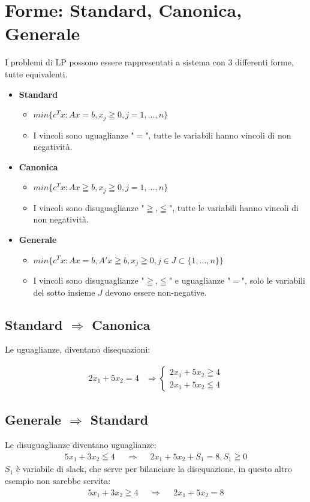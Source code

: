 \documentclass{article}
\begin{document}
\section{Forme: Standard, Canonica, Generale}
I problemi di LP possono essere rappresentati a sistema con 3 differenti forme, tutte equivalenti.\\
\begin{itemize}
\item \textbf{Standard}
\begin{itemize}
\item $min\{c^Tx:Ax=b,x_j \geqq 0, j=1,\dots,n \}$
\item I vincoli sono uguaglianze "$=$", tutte le variabili hanno vincoli di non negatività.
\end{itemize}

\item \textbf{Canonica}
\begin{itemize}
\item $min\{c^Tx:Ax \geqq b,x_j \geqq 0, j=1,\dots,n \}$
\item I vincoli sono disuguaglianze "$\geqq$,$\leqq$", tutte le variabili hanno vincoli di non negatività.
\end{itemize}

\item \textbf{Generale}
\begin{itemize}
\item $min\{c^Tx:Ax = b, A'x \geqq b, x_j \geqq 0, j \in J \subset \{1,\dots,n\} \}$
\item I vincoli sono disuguaglianze "$\geqq$,$\leqq$" e uguaglianze "$=$", solo le variabili del sotto insieme $J$ devono essere non-negative.
\end{itemize}
\end{itemize}

\subsection{Standard $\Rightarrow$ Canonica}
Le uguaglianze, diventano disequazioni:

\begin{align*}
2x_1 + 5x_2 = 4 & \Rightarrow  \left\{ \begin{array}{rcl} 2x_1 + 5x_2 \geqq 4 \\ 2x_1 + 5x_2 \leqq 4 \end{array}\right.
\end{align*}
\subsection{Generale $\Rightarrow$ Standard}
Le disuguaglianze diventano uguaglianze:
\begin{align*}
5x_1 + 3x_2 \leqq 4 & &\Rightarrow & &2x_1 + 5x_2 + S_1 = 8, S_1 \geqq 0
\end{align*}
$S_1$ è variabile di slack, che serve per bilanciare la disequazione, in questo altro esempio non sarebbe servita:
\begin{align*}
5x_1 + 3x_2 \geqq 4 & &\Rightarrow & &2x_1 + 5x_2 = 8
\end{align*}
\end{document}
